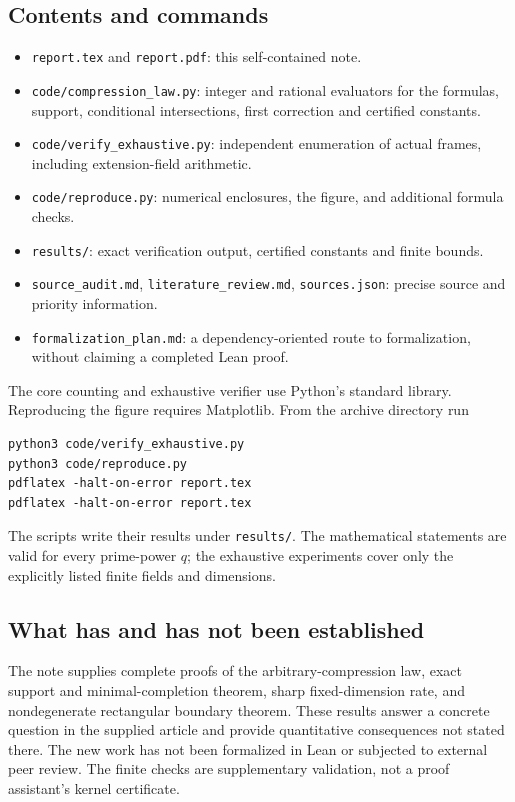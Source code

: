 \documentclass[11pt]{article}
\numberwithin{equation}{section}
\theoremstyle{definition}
\theoremstyle{remark}
\newcommand{\code}[1]{\nolinkurl{#1}}
\begin{document}
\subsection{Contents and commands}
\begin{itemize}[leftmargin=1.5em]
\item \code{report.tex} and \code{report.pdf}: this self-contained note.
\item \code{code/compression_law.py}: integer and rational evaluators for the formulas, support, conditional intersections, first correction and certified constants.
\item \code{code/verify_exhaustive.py}: independent enumeration of actual frames, including extension-field arithmetic.
\item \code{code/reproduce.py}: numerical enclosures, the figure, and additional formula checks.
\item \code{results/}: exact verification output, certified constants and finite bounds.
\item \code{source_audit.md}, \code{literature_review.md}, \code{sources.json}: precise source and priority information.
\item \code{formalization_plan.md}: a dependency-oriented route to formalization, without claiming a completed Lean proof.
\end{itemize}
The core counting and exhaustive verifier use Python's standard library. Reproducing the figure requires Matplotlib. From the archive directory run
\begin{verbatim}
python3 code/verify_exhaustive.py
python3 code/reproduce.py
pdflatex -halt-on-error report.tex
pdflatex -halt-on-error report.tex
\end{verbatim}
The scripts write their results under \code{results/}. The mathematical statements are valid for every prime-power $q$; the exhaustive experiments cover only the explicitly listed finite fields and dimensions.

\subsection{What has and has not been established}
The note supplies complete proofs of the arbitrary-compression law, exact support and minimal-completion theorem, sharp fixed-dimension rate, and nondegenerate rectangular boundary theorem. These results answer a concrete question in the supplied article and provide quantitative consequences not stated there. The new work has not been formalized in Lean or subjected to external peer review. The finite checks are supplementary validation, not a proof assistant's kernel certificate.
\end{document}
